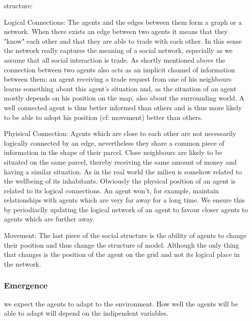 \documentclass{JASSS}
\begin{document}
	structure:
	\begin{description*}
		\item[Logical Connections:]
			The agents and the edges between them form a graph or a network. When there exists an edge between two agents it means that they "know" each other and that they are able to trade with each other. In this sense the network really captures the meaning of a social network, especially as we assume that all social interaction is trade. As shortly mentioned above the connection between two agents also acts as an implicit channel of information between them: an agent receiving a trade request from one of his neighbours learns something about this agent's situation and, as the situation of an agent mostly depends on his position on the map, also about the surrounding world. A well connected agent is thus better informed than others and is thus more likely to be able to adopt his position (cf: movement) better than others.
			
		\item[Phyisical Connection:]
			Agents which are close to each other are not necessarily logically connected by an edge, nevertheless they share a common piece of information in the shape of their parcel. Close neighbours are likely to be situated on the same parcel, thereby receiving the same amount of money and having a similar situation. As in the real world the milieu is somehow related to the wellbeing of its inhabitants. Obviously the physical position of an agent is related to its logical connections. An agent won't, for example, maintain relationships with agents which are very far away for a long time. We ensure this by periodiaclly updating the logical network of an agent to favour closer agents to agents which are further away.
			
		\item[Movement:]
			The last piece of the social structure is the ability of agents to change their position and thus change the structure of model. Although the only thing that changes is the position of the agent on the grid and not its logical place in the network. 
	\end{description*}
	

\subsubsection{Emergence}
	we expect the agents to adapt to the environment. How well the agents will be able to adapt will depend on the indipendent variables.
\end{document}
